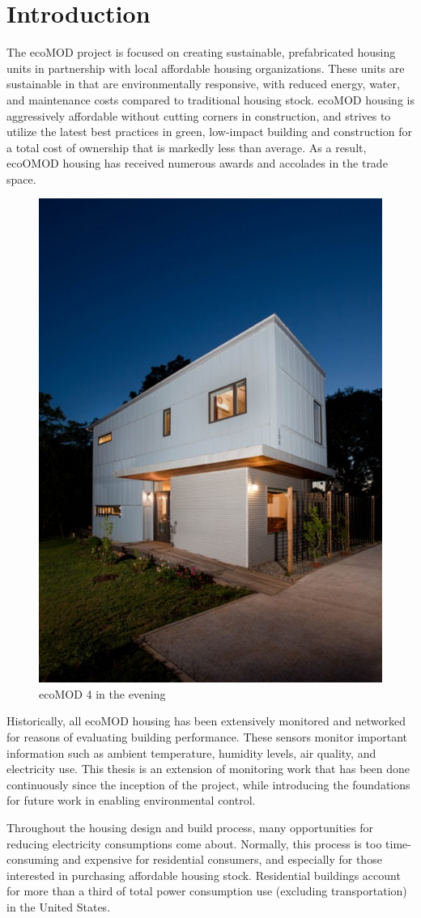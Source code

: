 \chapter{Introduction}

The ecoMOD project is focused on creating sustainable, prefabricated housing units in partnership with local affordable housing organizations. These units are sustainable in that are environmentally responsive, with reduced energy, water, and maintenance costs compared to traditional housing stock. ecoMOD housing is aggressively affordable without cutting corners in construction, and strives to utilize the latest best practices in green, low-impact building and construction for a total cost of ownership that is markedly less than average. As a result, ecoOMOD housing has received numerous awards and accolades in the trade space\cite{Lau2013}.

\begin{figure}
\centering
\includegraphics[width=0.3\linewidth]{./images/SFSmith_110602_8113-copy-500x705}
\caption{ecoMOD 4 in the evening\cite{Smith2011}}
\label{fig:SFSmith_110602_8113-copy-500x705}
\end{figure}

Historically, all ecoMOD housing has been extensively monitored and networked for reasons of evaluating building performance. These sensors monitor important information such as ambient temperature, humidity levels, air quality, and electricity use. This thesis is an extension of monitoring work that has been done continuously since the inception of the project, while introducing the foundations for future work in enabling environmental control. 

Throughout the housing design and build process, many opportunities for reducing electricity consumptions come about. Normally, this process is too time-consuming and expensive for residential consumers, and especially for those interested in purchasing affordable housing stock. Residential buildings account for more than a third of total power consumption use (excluding transportation) in the United States\cite{EIA2015}.

